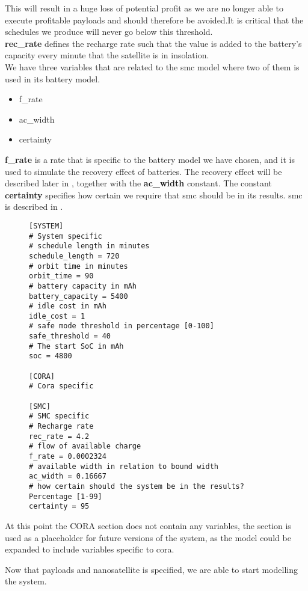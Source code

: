 This will result in a huge loss of potential profit as we are no longer able to execute profitable payloads and should therefore be avoided.It is critical that the schedules we produce will never go below this threshold.\\
\textbf{rec\_rate}  defines the recharge rate such that the value is added to the battery's capacity every minute that the satellite is in insolation.\\
We have three variables that are related to the \gls{smc} model where two of them is used in its battery model.\\
\begin{itemize}
	\item f\_rate
	\item ac\_width
	\item certainty
\end{itemize}
\textbf{f\_rate} is a rate that is specific to the battery model we have chosen, and it is used to simulate the recovery effect of batteries. The recovery effect will be described later in , together with the \textbf{ac\_width} constant.
The constant \textbf{certainty} specifies how certain we require that \gls{smc} should be in its results. \gls{smc} is described in .
\begin{figure}[H]
\begin{lstlisting}[caption={Example of how the environment can be defined}, label=lst:ini, language=text]
[SYSTEM]
# System specific
# schedule length in minutes
schedule_length = 720
# orbit time in minutes
orbit_time = 90
# battery capacity in mAh
battery_capacity = 5400
# idle cost in mAh
idle_cost = 1
# safe mode threshold in percentage [0-100]
safe_threshold = 40
# The start SoC in mAh
soc = 4800

[CORA]
# Cora specific

[SMC]
# SMC specific
# Recharge rate
rec_rate = 4.2
# flow of available charge
f_rate = 0.0002324
# available width in relation to bound width
ac_width = 0.16667
# how certain should the system be in the results? Percentage [1-99]
certainty = 95
\end{lstlisting}
\end{figure}
At this point the CORA section does not contain any variables, the section is used as a placeholder for future versions of the system, as the model could be expanded to include variables specific to \gls{cora}.

Now that payloads and nanosatellite is specified, we are able to start modelling the system.
